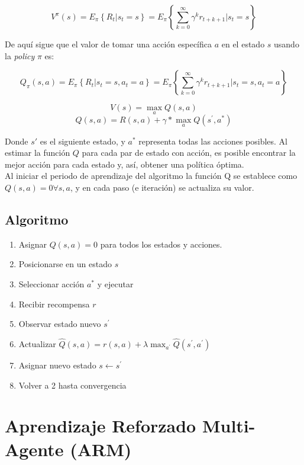 $$
V^{\pi}(s) = E_{\pi}\left\{R_{t}|s_{t} = s\right\} = E_{\pi}\left\{\sum_{k=0}^{\infty}\gamma^{k}r_{t+k+1}|s_{t}=s\right\}
$$

De aqu\'i sigue que el valor de tomar una acci\'on espec\'ifica $a$ en el estado $s$ usando la \textit{policy} $\pi$ es:

$$
    Q_{\pi}(s,a) = E_{\pi}\left\{R_{t}|s_{t}=s,a_{t}=a\right\}=E_{\pi}\left \{\sum_{k = 0}^{\infty}\gamma^{k}r_{t+k+1}|s_{t} =s, a_{t} =a  \right \}
$$

$$
V(s) = \max_{a}{Q(s,a)}
$$
$$
Q(s, a) = R(s, a) + \gamma * \max_{a}{Q(s^{'}, a^{*})}
$$

Donde $s{'}$ es el siguiente estado, y $a^{*}$ representa todas las acciones posibles. Al estimar la funci\'on $Q$ para cada par de estado con acci\'on, es posible encontrar la mejor acci\'on para cada estado y, as\'i, obtener una pol\'itica \'optima.\\

Al iniciar el periodo de aprendizaje del algoritmo la funci\'on Q se establece como $Q(s,a) = 0 \forall s, a$, y en cada paso (e iteraci\'on) se actualiza su valor.

\subsection{Algoritmo}

\begin{enumerate}
    \item Asignar $Q(s,a) = 0$ para todos los estados y acciones.
    \item Posicionarse en un estado $s$
    \item Seleccionar acci\'on $a^{*}$ y ejecutar
    \item Recibir recompensa $r$
    \item Observar estado nuevo $s^{'}$
    \item Actualizar $\hat{Q}(s,a) = r(s,a) + \lambda \max _{ a^{'} }{  \hat{Q}(s^{'},a^{'}) }$
    \item Asignar nuevo estado $s \leftarrow s^{'}$
    \item Volver a 2 hasta convergencia
\end{enumerate}

\section{Aprendizaje Reforzado Multi-Agente (ARM)}

